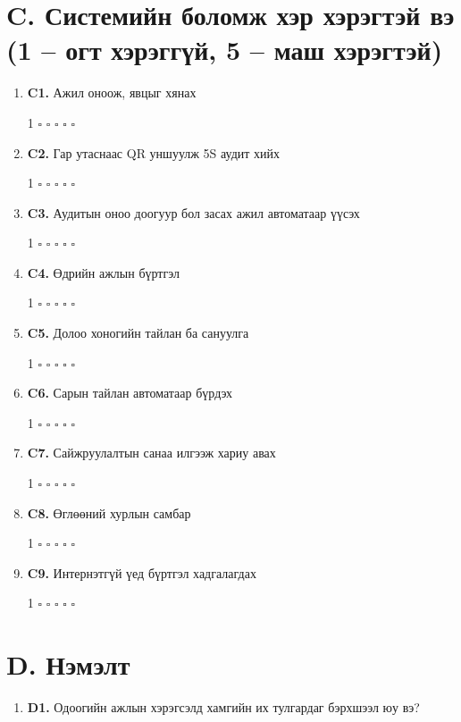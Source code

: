 \section*{C. Системийн боломж хэр хэрэгтэй вэ (1 -- огт хэрэггүй, 5 -- маш хэрэгтэй)}
\begin{enumerate}[label={}, leftmargin=0pt]
\item \textbf{C1.} Ажил оноож, явцыг хянах
\par 1 $\square$  $\square$  $\square$  $\square$  $\square$
\item \textbf{C2.} Гар утаснаас QR уншуулж 5S аудит хийх
\par 1 $\square$  $\square$  $\square$  $\square$  $\square$
\item \textbf{C3.} Аудитын оноо доогуур бол засах ажил автоматаар үүсэх
\par 1 $\square$  $\square$  $\square$  $\square$  $\square$
\item \textbf{C4.} Өдрийн ажлын бүртгэл
\par 1 $\square$  $\square$  $\square$  $\square$  $\square$
\item \textbf{C5.} Долоо хоногийн тайлан ба сануулга
\par 1 $\square$  $\square$  $\square$  $\square$  $\square$
\item \textbf{C6.} Сарын тайлан автоматаар бүрдэх
\par 1 $\square$  $\square$  $\square$  $\square$  $\square$
\item \textbf{C7.} Сайжруулалтын санаа илгээж хариу авах
\par 1 $\square$  $\square$  $\square$  $\square$  $\square$
\item \textbf{C8.} Өглөөний хурлын самбар
\par 1 $\square$  $\square$  $\square$  $\square$  $\square$
\item \textbf{C9.} Интернэтгүй үед бүртгэл хадгалагдах
\par 1 $\square$  $\square$  $\square$  $\square$  $\square$
\end{enumerate}

\section*{D. Нэмэлт}
\begin{enumerate}[label={}, leftmargin=0pt]
\item \textbf{D1.} Одоогийн ажлын хэрэгсэлд хамгийн их тулгардаг бэрхшээл юу вэ?
\par\vspace{0.3cm}\dotfill\par\dotfill
\end{enumerate}

